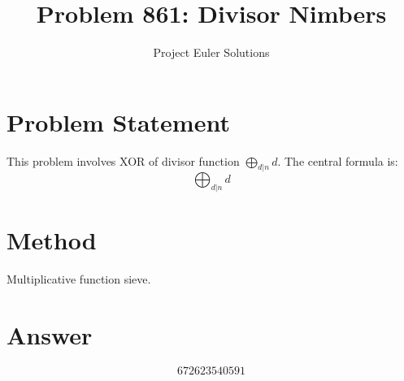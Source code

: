 \documentclass[11pt]{article}
\title{Problem 861: Divisor Nimbers}
\author{Project Euler Solutions}
\date{}
\begin{document}
\maketitle
\section{Problem Statement}
This problem involves XOR of divisor function $\bigoplus_{d|n} d$. The central formula is:
\[
\bigoplus_{d|n} d
\]
\section{Method}
Multiplicative function sieve.
\section{Answer}

\[
\boxed{672623540591}
\]
\end{document}
